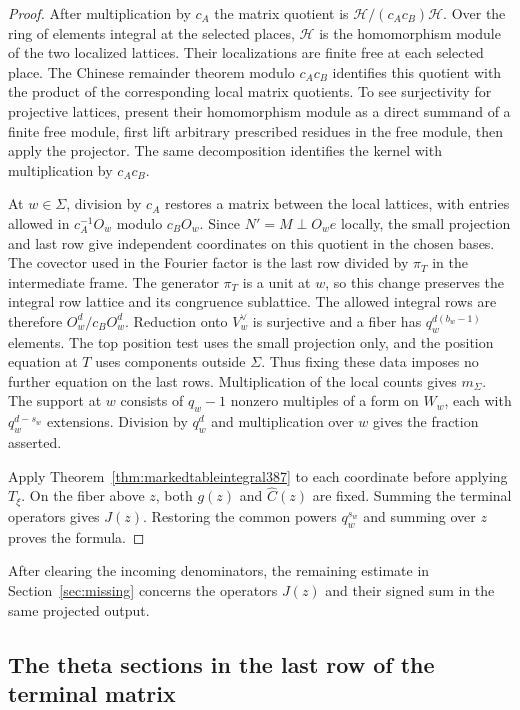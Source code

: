 \documentclass[a4paper,11pt]{article}
\theoremstyle{definition}
\theoremstyle{remark}
\numberwithin{equation}{section}
\begin{document}
\begin{proof}
After multiplication by \(c_A\) the matrix quotient is
\(\mathcal H/(c_Ac_B)\mathcal H\). Over the ring of elements
integral at the selected places, \(\mathcal H\) is the
homomorphism module of the two localized lattices. Their
localizations are finite free at each selected place.
The Chinese remainder theorem modulo \(c_Ac_B\) identifies
this quotient with the product of the corresponding local
matrix quotients. To see surjectivity for projective lattices,
present their homomorphism module as a direct summand of a
finite free module, first lift arbitrary prescribed residues
in the free module, then apply the projector. The same
decomposition identifies the kernel with multiplication by
\(c_Ac_B\).

At \(w\in\Sigma\), division by \(c_A\) restores a matrix
between the local lattices, with entries allowed in
\(c_A^{-1}O_w\) modulo \(c_BO_w\). Since \(N'=M\perp O_we\)
locally, the small projection and last row give independent
coordinates on this quotient in the chosen bases. The
covector used in the Fourier factor is the last row divided
by \(\pi_T\) in the intermediate frame. The generator
\(\pi_T\) is a unit at \(w\), so this change preserves the
integral row lattice and its congruence sublattice. The
allowed integral rows are therefore \(O_w^d/c_BO_w^d\).
Reduction onto \(V_w^\vee\) is surjective and a fiber has
\(q_w^{d(b_w-1)}\) elements. The top position test uses the
small projection only, and the position equation at \(T\)
uses components outside \(\Sigma\). Thus fixing these data
imposes no further equation on the last rows. Multiplication
of the local counts gives \(m_\Sigma\).
The support at \(w\) consists of \(q_w-1\) nonzero multiples
of a form on \(W_w\), each with \(q_w^{d-s_w}\) extensions.
Division by \(q_w^d\) and multiplication over \(w\) gives
the fraction asserted.

Apply Theorem~\ref{thm:markedtableintegral387} to each
coordinate before applying \(T_\xi\). On the fiber above
\(z\), both \(g(z)\) and \(\widehat C(z)\) are fixed.
Summing the terminal operators gives \(J(z)\). Restoring the
common powers \(q_w^{s_w}\) and summing over \(z\) proves
the formula.
\end{proof}

After clearing the incoming denominators, the remaining
estimate in Section~\ref{sec:missing} concerns the operators
\(J(z)\) and their signed sum in the same projected output.


\subsection{The theta sections in the last row of the terminal matrix}
\label{sec:normalrowtheta388}
\end{document}
